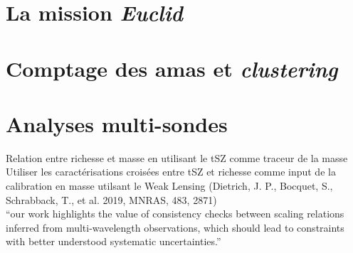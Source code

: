 %
%

{\color{vert}\lipsum[2-3]}

\section{La mission \emph{Euclid}}
{\color{vert}\lipsum[2-5]}

\section{Comptage des amas et \emph{clustering}}
{\color{vert}\lipsum[2-5]}

\section{Analyses multi-sondes}

Relation entre richesse et masse en utilisant le tSZ comme traceur de
la masse\\
Utiliser les caractérisations croisées entre tSZ et richesse comme
input de la calibration en masse utilsant le Weak Lensing (Dietrich,
J. P., Bocquet, S., Schrabback, T., et al. 2019, MNRAS, 483, 2871)\\


``our work highlights the value of consistency checks between scaling
relations inferred from multi-wavelength observations, which should
lead to constraints with better understood systematic uncertainties.''~\citep{Bleem2019} 


{\color{vert}\lipsum[2-5]}
